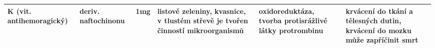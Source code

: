 \documentclass{article}
\begin{document}
\begin{landscape}
\begin{longtable}{| m{7em} | m{5em} | m{5em} | m{8em}<{\RaggedRight} | m{15em}<{\RaggedRight} | m{15em}<{\RaggedRight} | m{10em}<{\RaggedRight} |}
            \hline
            K (vit. antihemoragický) & deriv. naftochinonu & 1mg & listové zeleniny, kvasnice, v tlustém střevě je tvořen činností mikroorganismů & oxidoreduktáza, tvorba protisrážlivé látky protrombinu & krvácení do tkání a tělesných dutin, krvácení do mozku může zapříčinit smrt & \\
            \hline
        \end{longtable}
    \end{landscape}
\end{document}

